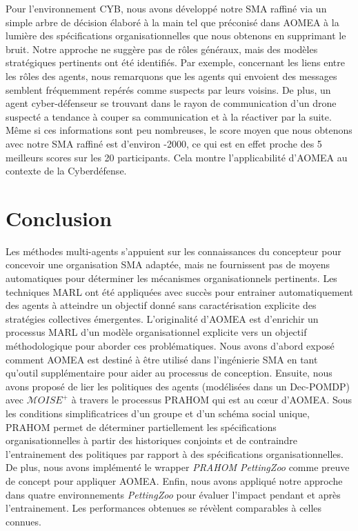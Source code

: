 \documentclass[contribution]{jfsma}
\begin{document}
Pour l'environnement CYB, nous avons développé notre SMA raffiné via un simple arbre de décision élaboré à la main tel que préconisé dans AOMEA à la lumière des spécifications organisationnelles que nous obtenons en supprimant le bruit. Notre approche ne suggère pas de rôles généraux, mais des modèles stratégiques pertinents ont été identifiés. Par exemple, concernant les liens entre les rôles des agents, nous remarquons que les agents qui envoient des messages semblent fréquemment repérés comme suspects par leurs voisins. De plus, un agent cyber-défenseur se trouvant dans le rayon de communication d’un drone suspecté a tendance à couper sa communication et à la réactiver par la suite. Même si ces informations sont peu nombreuses, le score moyen que nous obtenons avec notre SMA raffiné est d'environ -2000, ce qui est en effet proche des 5 meilleurs scores sur les 20 participants. Cela montre l'applicabilité d'AOMEA au contexte de la Cyberdéfense.

\section{Conclusion}

Les méthodes multi-agents s'appuient sur les connaissances du concepteur pour concevoir une organisation SMA adaptée, mais ne fournissent pas de moyens automatiques pour déterminer les mécanismes organisationnels pertinents.
Les techniques MARL ont été appliquées avec succès pour entrainer automatiquement des agents à atteindre un objectif donné sans caractérisation explicite des stratégies collectives émergentes.
L'originalité d'AOMEA est d'enrichir un processus MARL d'un modèle organisationnel explicite vers un objectif méthodologique pour aborder ces problématiques. Nous avons d'abord exposé comment AOMEA est destiné à être utilisé dans l'ingénierie SMA en tant qu'outil supplémentaire pour aider au processus de conception.
Ensuite, nous avons proposé de lier les politiques des agents (modélisées dans un Dec-POMDP) avec $\mathcal{M}OISE^+$ à travers le processus PRAHOM qui est au cœur d'AOMEA. Sous les conditions simplificatrices d'un groupe et d'un schéma social unique, PRAHOM permet de déterminer partiellement les spécifications organisationnelles à partir des historiques conjoints et de contraindre l'entrainement des politiques par rapport à des spécifications organisationnelles.
De plus, nous avons implémenté le wrapper \emph{PRAHOM PettingZoo} comme preuve de concept pour appliquer AOMEA.
Enfin, nous avons appliqué notre approche dans quatre environnements \emph{PettingZoo} pour évaluer l'impact pendant et après l'entrainement. Les performances obtenues se révèlent comparables à celles connues.
\end{document}
